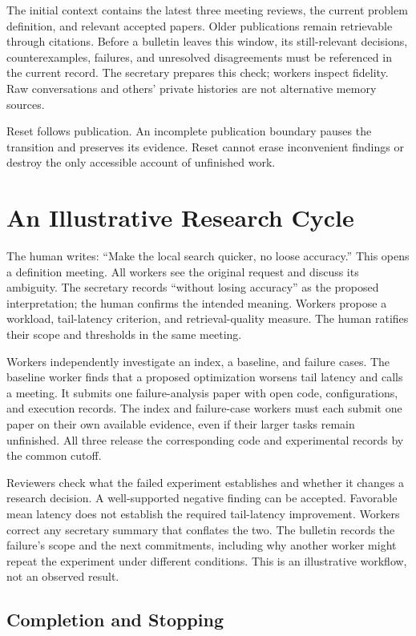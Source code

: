 \documentclass[11pt]{article}
\begin{document}
The initial context contains the latest three meeting reviews, the current problem definition, and relevant accepted papers. Older publications remain retrievable through citations. Before a bulletin leaves this window, its still-relevant decisions, counterexamples, failures, and unresolved disagreements must be referenced in the current record. The secretary prepares this check; workers inspect fidelity. Raw conversations and others' private histories are not alternative memory sources.

Reset follows publication. An incomplete publication boundary pauses the transition and preserves its evidence. Reset cannot erase inconvenient findings or destroy the only accessible account of unfinished work.

\section{An Illustrative Research Cycle}

The human writes: ``Make the local search quicker, no loose accuracy.'' This opens a definition meeting. All workers see the original request and discuss its ambiguity. The secretary records ``without losing accuracy'' as the proposed interpretation; the human confirms the intended meaning. Workers propose a workload, tail-latency criterion, and retrieval-quality measure. The human ratifies their scope and thresholds in the same meeting.

Workers independently investigate an index, a baseline, and failure cases. The baseline worker finds that a proposed optimization worsens tail latency and calls a meeting. It submits one failure-analysis paper with open code, configurations, and execution records. The index and failure-case workers must each submit one paper on their own available evidence, even if their larger tasks remain unfinished. All three release the corresponding code and experimental records by the common cutoff.

Reviewers check what the failed experiment establishes and whether it changes a research decision. A well-supported negative finding can be accepted. Favorable mean latency does not establish the required tail-latency improvement. Workers correct any secretary summary that conflates the two. The bulletin records the failure's scope and the next commitments, including why another worker might repeat the experiment under different conditions. This is an illustrative workflow, not an observed result.

\subsection{Completion and Stopping}
\end{document}
